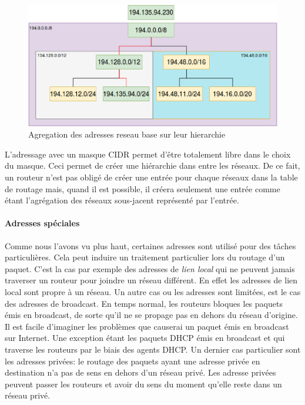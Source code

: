 \begin{figure}
\centering
\includegraphics[width=15cm]{./pics/routagecidr.eps}
\caption{Agregation des adresses reseau base sur leur hierarchie}
\label{fig:routcidr}
\end{figure}

L'adressage avec un masque CIDR permet d'être totalement libre dans le choix du
masque. Ceci permet de créer une hiérarchie dans entre les réseaux. De ce fait,
un routeur n'est pas obligé de créer une entrée pour chaque réseaux dans la
table de routage mais, quand il est possible, il créera seulement une entrée
comme étant l'agrégation des réseaux sous-jacent représenté par l'entrée.

\paragraph{Adresses spéciales}

Comme nous l'avons vu plus haut, certaines adresses sont utilisé pour des
tâches particulières. Cela peut induire un traitement particulier lors du routage
d'un paquet.  C'est la cas par exemple des adresses de {\it lien local} qui ne
peuvent jamais traverser un routeur pour joindre un réseau différent. En effet
les adresses de lien local sont propre à un réseau.
Un autre cas ou les adresses sont limitées, est le cas des adresses de broadcast.
En temps normal, les routeurs bloques les paquets émis en broadcast, de sorte qu'il ne se propage pas en dehors du réseau d'origine. Il est facile d'imaginer les problèmes que causerai un paquet émis en broadcast sur Internet. Une exception étant les paquets DHCP émis en broadcast et qui traverse les routeurs par le biais des agents DHCP.
Un dernier cas particulier sont les adresses privées: le routage des paquets ayant une adresse privée en destination n'a pas de sens en dehors d'un réseau privé. Les adresse privées peuvent passer les routeurs et avoir du sens du moment qu'elle reste dans un réseau privé.

